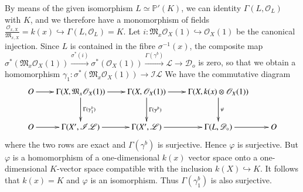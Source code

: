 By means of the given isomorphism $L \simeq \mathbb{P'}(K)$, we can
identity $\Gamma (L, \mathscr{O}_L)$ with $K$, and we therefore have a
monomorphism of fields\break
$\frac{\mathscr{O}_{x,X}}{\mathfrak{M}_{x,X}}=k(x)\hookrightarrow
\Gamma (L, \mathscr{O}_L)=K. $ Let $i: \mathfrak{M}_x \mathscr{O}_X(1)
\hookrightarrow \mathscr{O}_X(1)$ be the canonical injection. Since
$L$ is contained  in the fibre $\sigma^{-1}(x)$, the composite map
$\sigma^{*}(\mathfrak{M}_x \mathscr{O}_X(1)) \xrightarrow{\sigma^*(i)}
\sigma^*(\mathscr{O}_X(1)) \xrightarrow{\Gamma(\gamma^b)} \mathscr{L}\to
\mathscr{D}_o$ is zero, so that we obtain a homomorphism $\gamma_1 :
\sigma^{*} (\mathfrak{M}_x \mathscr{O}_X(1)) \rightarrow
\mathscr{I}\mathscr{L}$ 
We have the commutative diagram
{\fontsize{10}{12}\selectfont
$$
\xymatrix@R=1cm@C=.75cm{O \ar[r] &  \Gamma (X, \mathfrak{M}_x
  \mathscr{O}_X (1)) 
  \ar[d]^{\Gamma(\gamma_1^b)} \ar[r] & \ar[r] \Gamma (X, \mathscr{O}_X(1))
  \ar[d]^{\Gamma (\gamma^b)} & \Gamma (X, k(x)\otimes
  \mathscr{O}_X(1)) \ar[d]^\varphi& \\
O \ar[r] &  \Gamma (X', \mathscr{I}\mathscr{L})  \ar[r]& \Gamma (X',
\mathscr{L})  \ar[r] & \Gamma(L, \mathscr{D}_\circ) \ar[r] & O  }
$$}\relax
where the two rows are exact and $\Gamma(\gamma^b)$ is
surjective. Hence $\varphi$ is surjective. But $\varphi$ is a
homomorphism of a one-dimensional $k(x)$ vector space onto a
one-dimensional $K$-vector space compatible with the inclusion
$k(X)\hookrightarrow K$. It follows that $k(x)=K$ and $\varphi$ is an
isomorphism. Thus $\Gamma (\gamma^b_1)$ is also surjective. 
 
